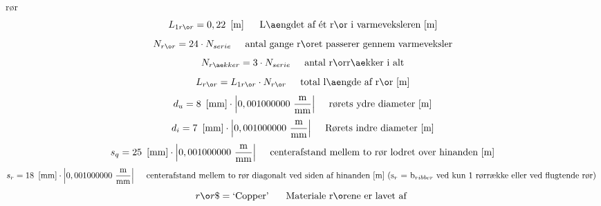 \documentclass[../Hovedrapport.tex]{subfiles}
\newcommand{\SC}[1]{\mbox{`#1'}\  }
\newcommand{\I}{\mbox{\hspace{0.20in}}}
\begin{document}
\vspace{0.10in}
\noindent
\rm rør
\begin{equation}
\label{EES Eqn:10}
L_{1rør} = 0,22   \   \left[ \rm m \right]	 
\mbox{\I Længdet af ét rør i varmeveksleren [m]}
\end{equation}
\begin{equation}
\label{EES Eqn:11}
N_{rør} = 24\cdot N_{serie	} 
\mbox{\I antal gange røret passerer gennem varmeveksler}
\end{equation}
\begin{equation}
\label{EES Eqn:12}
N_{rækker} = 3 \cdot  N_{serie	} 
\mbox{\I antal rørrækker i alt}
\end{equation}
\begin{equation}
\label{EES Eqn:13}
L_{rør} = L_{1rør} \cdot  N_{rør	} 
\mbox{\I total længde af rør [m]}
\end{equation}
\begin{equation}
\label{EES Eqn:14}
d_{u} = 8   \   \left[ \rm mm \right] \cdot  \rm { \left|0,001000000\ \frac {\rm{m}}{\rm{mm}}\right|}	 
\mbox{\I rørets ydre diameter [m]}
\end{equation}
\begin{equation}
\label{EES Eqn:15}
d_{i} = 7   \   \left[ \rm mm \right] \cdot  \rm { \left|0,001000000\ \frac {\rm{m}}{\rm{mm}}\right|}	 
\mbox{\I Rørets indre diameter [m]}
\end{equation}
\begin{equation}
\label{EES Eqn:16}
s_{q} = 25   \   \left[ \rm mm \right] \cdot  \rm { \left|0,001000000\ \frac {\rm{m}}{\rm{mm}}\right|}	 
\mbox{\I centerafstand mellem to rør lodret over hinanden [m]}
\end{equation}
\begin{equation}
\label{EES Eqn:17}
s_{r} = 18   \   \left[ \rm mm \right] \cdot  \rm { \left|0,001000000\ \frac {\rm{m}}{\rm{mm}}\right|}	 
\mbox{\I centerafstand mellem to rør diagonalt ved siden af hinanden [m] (s$_{r}$ = b$_{ribber}$ ved kun 1 rørrække eller ved flugtende rør) }
\end{equation}
\begin{equation}
\label{EES Eqn:18}
rør\$ = \SC{Copper} 	 
\mbox{\I Materiale rørene er lavet af }
\end{equation}
\end{document}
